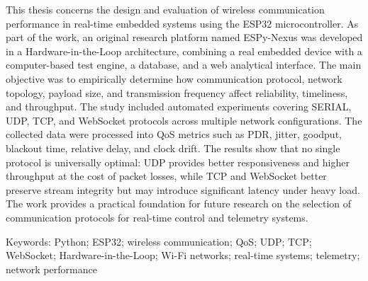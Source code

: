 This thesis concerns the design and evaluation of wireless communication performance in real-time embedded systems using the ESP32 microcontroller. As part of the work, an original research platform named ESPy-Nexus was developed in a Hardware-in-the-Loop architecture, combining a real embedded device with a computer-based test engine, a database, and a web analytical interface. The main objective was to empirically determine how communication protocol, network topology, payload size, and transmission frequency affect reliability, timeliness, and throughput. The study included automated experiments covering SERIAL, UDP, TCP, and WebSocket protocols across multiple network configurations. The collected data were processed into QoS metrics such as PDR, jitter, goodput, blackout time, relative delay, and clock drift. The results show that no single protocol is universally optimal: UDP provides better responsiveness and higher throughput at the cost of packet losses, while TCP and WebSocket better preserve stream integrity but may introduce significant latency under heavy load. The work provides a practical foundation for future research on the selection of communication protocols for real-time control and telemetry systems.

Keywords: Python; ESP32; wireless communication; QoS; UDP; TCP; WebSocket; Hardware-in-the-Loop; Wi-Fi networks; real-time systems; telemetry; network performance

